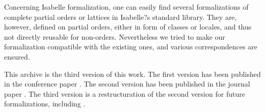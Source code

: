 \documentclass[11pt,a4paper]{article}
\begin{document}
Concerning Isabelle formalization, one can easily find several formalizations 
of complete partial orders or lattices in Isabelle?s standard library. They are, 
however, defined on partial orders, either in form of classes or locales, and 
thus not directly reusable for non-orders. Nevertheless we tried to make our 
formalization compatible with the existing ones, and various
correspondences are ensured.

This archive is the third version of this work.
The first version has been published in
the conference paper \cite{yamada19}.
The second version has been published in the 
journal paper \cite{DubutY21}.
The third version is a restructuration of the second version
for future formalizations, including \cite{yamada23}.





\end{document}
